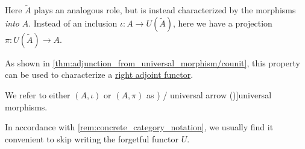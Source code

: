\begin{definition}
\begin{thmenum}
    Here \( \widetilde{A} \) plays an analogous role, but is instead characterized by the morphisms \emph{into} \( A \). Instead of an inclusion \( \iota: A \to U(\widetilde{A}) \), here we have a projection \( \pi: U(\widetilde{A}) \to A \).

    As shown in \cref{thm:adjunction_from_universal_morphism/counit}, this property can be used to characterize a \hyperref[def:adjoint_functor]{right adjoint functor}.
  \end{thmenum}

  We refer to either \( (A, \iota) \) or \( (A, \pi) \) as \term[en=universal morphism (\cite[233]{MacLane1971CategoricalAlgebraFoundations}) / universal arrow (\cite[55]{MacLane1998CategoryTheory})]{universal morphisms}.
\end{definition}
\begin{comments}
  \item In accordance with \cref{rem:concrete_category_notation}, we usually find it convenient to skip writing the forgetful functor \( U \).
\end{comments}

